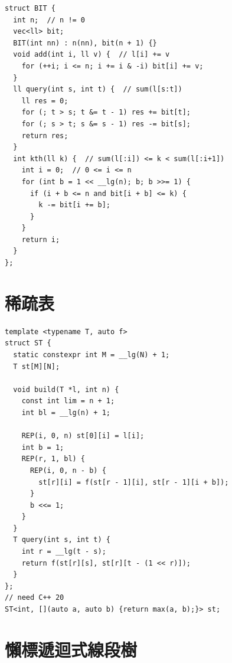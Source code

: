\documentclass[10pt, a4paper, twocolumn]{article}
\begin{document}
\begin{verbatim}
struct BIT {
  int n;  // n != 0
  vec<ll> bit;
  BIT(int nn) : n(nn), bit(n + 1) {}
  void add(int i, ll v) {  // l[i] += v
    for (++i; i <= n; i += i & -i) bit[i] += v;
  }
  ll query(int s, int t) {  // sum(l[s:t])
    ll res = 0;
    for (; t > s; t &= t - 1) res += bit[t];
    for (; s > t; s &= s - 1) res -= bit[s];
    return res;
  }
  int kth(ll k) {  // sum(l[:i]) <= k < sum(l[:i+1])
    int i = 0;  // 0 <= i <= n
    for (int b = 1 << __lg(n); b; b >>= 1) {
      if (i + b <= n and bit[i + b] <= k) {
        k -= bit[i += b];
      }
    }
    return i;
  }
};
\end{verbatim}

\section{稀疏表}

\begin{verbatim}
template <typename T, auto f>
struct ST {
  static constexpr int M = __lg(N) + 1;
  T st[M][N];

  void build(T *l, int n) {
    const int lim = n + 1;
    int bl = __lg(n) + 1;

    REP(i, 0, n) st[0][i] = l[i];
    int b = 1;
    REP(r, 1, bl) {
      REP(i, 0, n - b) {
        st[r][i] = f(st[r - 1][i], st[r - 1][i + b]);
      }
      b <<= 1;
    }
  }
  T query(int s, int t) {
    int r = __lg(t - s);
    return f(st[r][s], st[r][t - (1 << r)]);
  }
};
// need C++ 20
ST<int, [](auto a, auto b) {return max(a, b);}> st;
\end{verbatim}

\section{懶標遞迴式線段樹}
\end{document}

